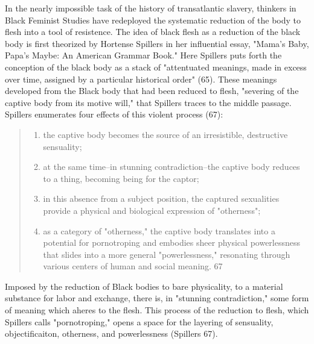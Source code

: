 \documentclass[11pt]{article}
\begin{document}
In the nearly impossible task of the history of transatlantic slavery,
thinkers in Black Feminist Studies have redeployed the systematic
reduction of the body to flesh into a tool of resistence. The idea of
black flesh as a reduction of the black body is first theorized by
Hortense Spillers in her influential essay, "Mama's Baby, Papa's
Maybe: An American Grammar Book." Here Spillers puts forth the
conception of the black body as a stack of "attentuated meanings, made
in excess over time, assigned by a particular historical order"
(65). These meanings developed from the Black body that had been
reduced to flesh, "severing of the captive body from its motive will,"
that Spillers traces to the middle passage. Spillers enumerates four
effects of this violent process (67):
\begin{quote}
\begin{enumerate}
\item the captive body becomes the source of an irresistible, destructive
sensuality;
\item at the same time--in stunning contradiction--the captive body
reduces to a thing, becoming being for the captor;
\item in this absence from a subject position, the captured sexualities
provide a physical and biological expression of "otherness";
\item as a category of "otherness," the captive body translates into a
potential for pornotroping and embodies sheer physical
powerlessness that slides into a more general "powerlessness,"
resonating through various centers of human and social meaning. 67
\end{enumerate}
\end{quote}
Imposed by the reduction of Black bodies to bare physicality, to a
material substance for labor and exchange, there is, in "stunning
contradiction," some form of meaning which aheres to the flesh. This
process of the reduction to flesh, which Spillers calls
"pornotroping," opens a space for the layering of sensuality,
objectificaiton, otherness, and powerlessness (Spillers 67).
\end{document}

